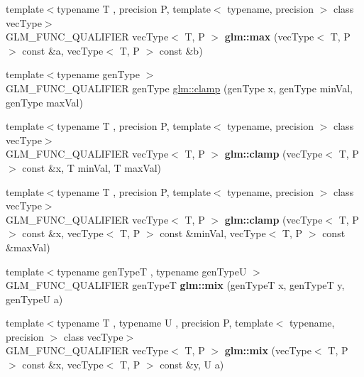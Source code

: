 \begin{DoxyCompactItemize}
\item 
\hypertarget{group__core__func__common_gad2ac6877ac7872a402ef5cae9bc6a30b}{{\footnotesize template$<$typename T , precision P, template$<$ typename, precision $>$ class vec\-Type$>$ }\\G\-L\-M\-\_\-\-F\-U\-N\-C\-\_\-\-Q\-U\-A\-L\-I\-F\-I\-E\-R vec\-Type$<$ T, P $>$ {\bfseries glm\-::max} (vec\-Type$<$ T, P $>$ const \&a, vec\-Type$<$ T, P $>$ const \&b)}\label{group__core__func__common_gad2ac6877ac7872a402ef5cae9bc6a30b}

\item 
{\footnotesize template$<$typename gen\-Type $>$ }\\G\-L\-M\-\_\-\-F\-U\-N\-C\-\_\-\-Q\-U\-A\-L\-I\-F\-I\-E\-R gen\-Type \hyperlink{group__core__func__common_ga93bce26c7d80d30a62f5c508f8498a6c}{glm\-::clamp} (gen\-Type x, gen\-Type min\-Val, gen\-Type max\-Val)
\item 
\hypertarget{group__core__func__common_gaf9deddb167a3055ca51cd9af3ce535f6}{{\footnotesize template$<$typename T , precision P, template$<$ typename, precision $>$ class vec\-Type$>$ }\\G\-L\-M\-\_\-\-F\-U\-N\-C\-\_\-\-Q\-U\-A\-L\-I\-F\-I\-E\-R vec\-Type$<$ T, P $>$ {\bfseries glm\-::clamp} (vec\-Type$<$ T, P $>$ const \&x, T min\-Val, T max\-Val)}\label{group__core__func__common_gaf9deddb167a3055ca51cd9af3ce535f6}

\item 
\hypertarget{group__core__func__common_ga240b9ec68274f12a2c4b6debf8979d1c}{{\footnotesize template$<$typename T , precision P, template$<$ typename, precision $>$ class vec\-Type$>$ }\\G\-L\-M\-\_\-\-F\-U\-N\-C\-\_\-\-Q\-U\-A\-L\-I\-F\-I\-E\-R vec\-Type$<$ T, P $>$ {\bfseries glm\-::clamp} (vec\-Type$<$ T, P $>$ const \&x, vec\-Type$<$ T, P $>$ const \&min\-Val, vec\-Type$<$ T, P $>$ const \&max\-Val)}\label{group__core__func__common_ga240b9ec68274f12a2c4b6debf8979d1c}

\item 
\hypertarget{group__core__func__common_ga8e93f374aae27d1a88b921860351f8d4}{{\footnotesize template$<$typename gen\-Type\-T , typename gen\-Type\-U $>$ }\\G\-L\-M\-\_\-\-F\-U\-N\-C\-\_\-\-Q\-U\-A\-L\-I\-F\-I\-E\-R gen\-Type\-T {\bfseries glm\-::mix} (gen\-Type\-T x, gen\-Type\-T y, gen\-Type\-U a)}\label{group__core__func__common_ga8e93f374aae27d1a88b921860351f8d4}

\item 
\hypertarget{group__core__func__common_gaa51ef964cbf80ee9c2364d629693c8c8}{{\footnotesize template$<$typename T , typename U , precision P, template$<$ typename, precision $>$ class vec\-Type$>$ }\\G\-L\-M\-\_\-\-F\-U\-N\-C\-\_\-\-Q\-U\-A\-L\-I\-F\-I\-E\-R vec\-Type$<$ T, P $>$ {\bfseries glm\-::mix} (vec\-Type$<$ T, P $>$ const \&x, vec\-Type$<$ T, P $>$ const \&y, U a)}\label{group__core__func__common_gaa51ef964cbf80ee9c2364d629693c8c8}


\end{DoxyCompactItemize}
